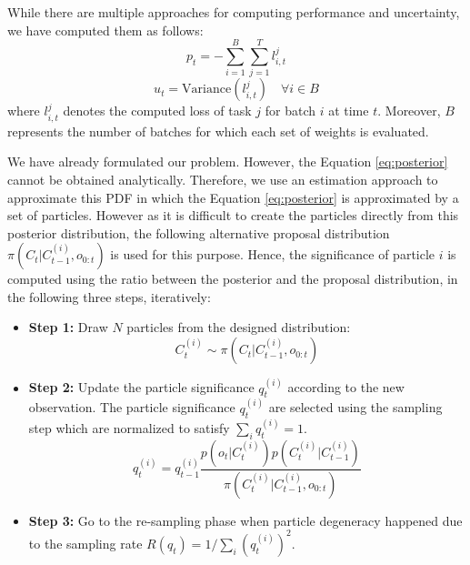 \documentclass[12pt,a4paper]{article}
\begin{document}
	While there are multiple approaches for computing performance and uncertainty, we have computed them as follows:
	\begin{equation}
		p_t = - \sum_{i=1}^{B} \sum_{j=1}^{T} l_{i,t}^j
		\label{eq:performance}
	\end{equation}
	\begin{equation}
		u_t = \text{Variance}(l_{i,t}^j) \quad \forall i \in B
		\label{eq:uncertainty}
	\end{equation}
	where \(l_{i,t}^j\) denotes the computed loss of task \(j\) for batch \(i\) at time \(t\). Moreover, \(B\) represents the number of batches for which each set of weights is evaluated.
	
	We have already formulated our problem. However, the Equation \ref{eq:posterior} cannot be obtained analytically. Therefore, we use an estimation approach to approximate this PDF in which the Equation \ref{eq:posterior} is approximated by a set of particles. However as it is difficult to create the particles directly from this posterior distribution, the following alternative proposal distribution \(\pi(C_t | C_{t-1}^{(i)}, o_{0:t})\) is used for this purpose. Hence, the significance of particle \(i\) is computed using the ratio between the posterior and the proposal distribution, in the following three steps, iteratively:
	
	\begin{itemize}
		\item \textbf{Step 1:} Draw \(N\) particles from the designed distribution:
		\[
		C_t^{(i)} \sim \pi(C_t | C_{t-1}^{(i)}, o_{0:t})
		\]
		
		\item \textbf{Step 2:} Update the particle significance \(q_t^{(i)}\) according to the new observation. The particle significance \(q_t^{(i)}\) are selected using the sampling step which are normalized to satisfy \(\sum_i q_t^{(i)} = 1\).
		\[
		q_t^{(i)} = q_{t-1}^{(i)} \frac{p(o_t | C_t^{(i)}) p(C_t^{(i)} | C_{t-1}^{(i)})}{\pi(C_t^{(i)} | C_{t-1}^{(i)}, o_{0:t})}
		\]
		
		\item \textbf{Step 3:} Go to the re-sampling phase when particle degeneracy happened due to the sampling rate \(R(q_t) = 1 / \sum_i (q_t^{(i)})^2\).
	\end{itemize}
	
\end{document}
